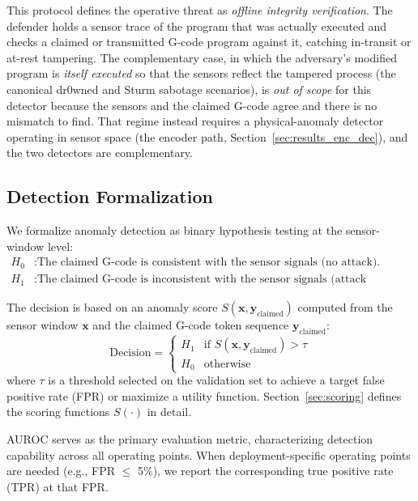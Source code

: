 This protocol defines the operative threat as \emph{offline integrity verification}.
The defender holds a sensor trace of the program that was actually executed and checks a claimed or transmitted G-code program against it, catching in-transit or at-rest tampering.
The complementary case, in which the adversary's modified program is \emph{itself executed} so that the sensors reflect the tampered process (the canonical dr0wned and Sturm sabotage scenarios), is \emph{out of scope} for this detector because the sensors and the claimed G-code agree and there is no mismatch to find.
That regime instead requires a physical-anomaly detector operating in sensor space (the encoder path, Section~\ref{sec:results_enc_dec}), and the two detectors are complementary.

\subsection{Detection Formalization}
\label{sec:detection_model}

We formalize anomaly detection as binary hypothesis testing at the sensor-window level:
\begin{align}
    H_0 &: \text{The claimed G-code is consistent with the sensor signals (no attack).} \nonumber \\
    H_1 &: \text{The claimed G-code is inconsistent with the sensor signals (attack present).}
    \label{eq:hypotheses}
\end{align}

The decision is based on an anomaly score $S(\mathbf{x}, \mathbf{y}_{\text{claimed}})$ computed from the sensor window $\mathbf{x}$ and the claimed G-code token sequence $\mathbf{y}_{\text{claimed}}$:
\begin{equation}
    \text{Decision} = \begin{cases}
        H_1 & \text{if } S(\mathbf{x}, \mathbf{y}_{\text{claimed}}) > \tau \\
        H_0 & \text{otherwise}
    \end{cases}
    \label{eq:decision}
\end{equation}
where $\tau$ is a threshold selected on the validation set to achieve a target false positive rate (FPR) or maximize a utility function.
Section~\ref{sec:scoring} defines the scoring functions $S(\cdot)$ in detail.

AUROC serves as the primary evaluation metric, characterizing detection capability across all operating points.
When deployment-specific operating points are needed (e.g., FPR $\leq$ 5\%), we report the corresponding true positive rate (TPR) at that FPR.
